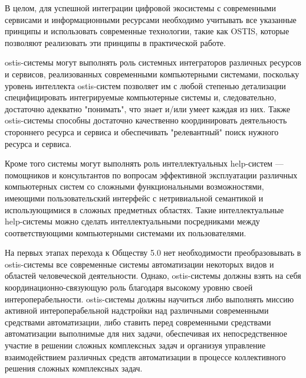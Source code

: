 В целом, для успешной интеграции цифровой экосистемы с современными сервисами и информационными ресурсами необходимо учитывать все указанные принципы и использовать современные технологии, такие как OSTIS, которые позволяют реализовать эти принципы в практической работе.

ostis-системы могут выполнять роль системных интеграторов различных ресурсов и сервисов, реализованных современными компьютерными системами, поскольку уровень интеллекта ostis-систем позволяет им с любой степенью детализации специфицировать интегрируемые компьютерные системы и, следовательно, достаточно адекватно "понимать", что знает и/или умеет каждая из них. Также ostis-системы способны достаточно качественно координировать деятельность стороннего ресурса и сервиса и обеспечивать "релевантный" поиск нужного ресурса и сервиса. 

Кроме того системы могут выполнять роль интеллектуальных help-систем --- помощников и консультантов по вопросам эффективной эксплуатации различных компьютерных систем со сложными функциональными возможностями, имеющими пользовательский интерфейс с нетривиальной семантикой и использующимися в сложных предметных областях. 
Такие интеллектуальные help-системы можно сделать интеллектуальными посредниками между соответствующими компьютерными системами их пользователями.

На первых этапах перехода к Обществу 5.0 нет необходимости преобразовывать в ostis-системы все современные системы автоматизации некоторых видов и областей человеческой деятельности. 
Однако, ostis-системы должны взять на себя координационно-связующую роль благодаря высокому уровню своей интероперабельности. 
ostis-системы должны научиться либо выполнять миссию активной интероперабельной надстройки над различными современными средствами автоматизации, либо ставить перед современными средствами автоматизации выполнимые для них задачи, обеспечивая их непосредственное участие в решении сложных комплексных задач и организуя управление взаимодействием различных средств автоматизации в процессе коллективного решения сложных комплексных задач.
